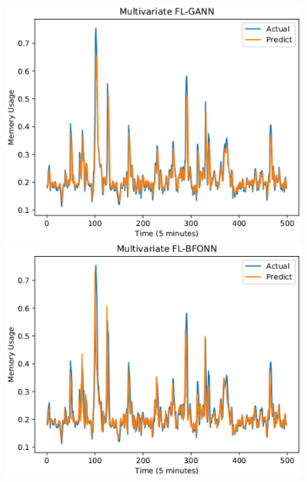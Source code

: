 \documentclass[runningheads]{llncs}
\begin{document}
\begin{figure}[!ht]
	\centering
	\begin{minipage}[t]{4cm}
		\centering
		\includegraphics[width=1\textwidth]{images/pdf/multi_ram_flgann.eps}
	\end{minipage}
	\begin{minipage}[t]{4cm}
		\centering
		\includegraphics[width=1\textwidth]{images/pdf/multi_ram_flbfonn.eps}
	\end{minipage}
	\begin{minipage}[t]{4cm}
		\centering

\end{minipage}
\end{figure}
\end{document}
